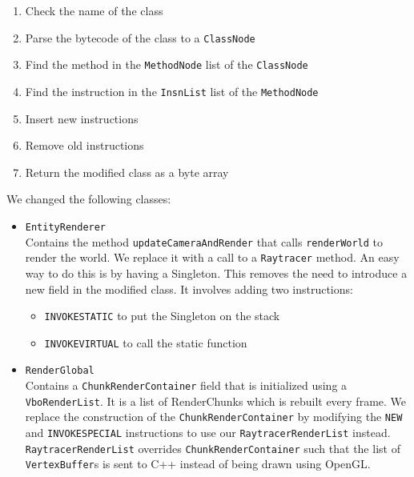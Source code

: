 \documentclass[]{article}
\begin{document}
\begin{enumerate}
  \item Check the name of the class
  \item Parse the bytecode of the class to a \texttt{ClassNode}
  \item Find the method in the \texttt{MethodNode} list of the \texttt{ClassNode}
  \item Find the instruction in the \texttt{InsnList} list of the \texttt{MethodNode}
  \item Insert new instructions
  \item Remove old instructions
  \item Return the modified class as a byte array
\end{enumerate}

We changed the following classes:

\begin{itemize}
  \item \texttt{EntityRenderer} \\
    Contains the method \texttt{updateCameraAndRender} that calls \texttt{renderWorld} to render the world.
    We replace it with a call to a \texttt{Raytracer} method.
    An easy way to do this is by having a Singleton.
    This removes the need to introduce a new field in the modified class.
    It involves adding two instructions:
    \begin{itemize}
      \item \texttt{INVOKESTATIC} to put the Singleton on the stack
      \item \texttt{INVOKEVIRTUAL} to call the static function
    \end{itemize}
  \item \texttt{RenderGlobal} \\
    Contains a \texttt{ChunkRenderContainer} field that is initialized using a \texttt{VboRenderList}.
    It is a list of RenderChunks which is rebuilt every frame.
    We replace the construction of the \texttt{ChunkRenderContainer} by modifying the \texttt{NEW} and \texttt{INVOKESPECIAL} instructions to use our \texttt{RaytracerRenderList} instead.
    \texttt{RaytracerRenderList} overrides \texttt{ChunkRenderContainer} such that the list of \texttt{VertexBuffer}s is sent to C++ instead of being drawn using OpenGL.
\end{itemize}

\end{document}
